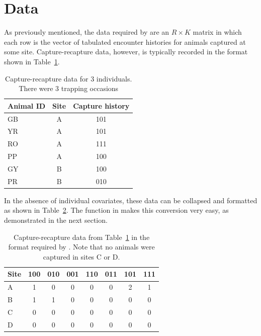 \documentclass[a4paper]{article}
\begin{document}
\section{Data}
As previously mentioned, the data required by  are an $R \times K$
matrix in which each row is the vector of tabulated encounter
histories for animals captured at some site. Capture-recapture data,
however, is typically recorded in the format shown in
Table~\ref{tab:raw}.

\begin{table}[h]
  \centering
  \caption{Capture-recapture data for 3 individuals. There were 3
    trapping occasions}
  \begin{tabular}{lcc}
    \hline
    Animal ID   & Site  & Capture history \\
    \hline
    GB        & A     & 101 \\
    YR        & A     & 101 \\
    RO        & A     & 111 \\
    PP        & A     & 100 \\
    GY        & B     & 100 \\
    PR        & B     & 010 \\
    \hline
  \end{tabular}
  \label{tab:raw}
\end{table}

In the absence of individual covariates, these data can be collapsed
and formatted as shown in Table~\ref{tab:format}. The 
function in  makes this conversion very easy, as
demonstrated in the next section.

\begin{table}[h]
  \centering
  \caption{Capture-recapture data from Table~\ref{tab:raw} in the
    format required by . Note that no animals were
    captured in sites C or D.}
  \begin{tabular}{lccccccc}
    \hline
    Site  & 100 & 010 & 001 & 110 & 011 & 101 & 111 \\
    \hline
    A     & 1   & 0   & 0   & 0   & 0   & 2   & 1   \\
    B     & 1   & 1   & 0   & 0   & 0   & 0   & 0   \\
    C     & 0   & 0   & 0   & 0   & 0   & 0   & 0   \\
    D     & 0   & 0   & 0   & 0   & 0   & 0   & 0   \\
    \hline
  \end{tabular}
  \label{tab:format}
\end{table}
\end{document}

